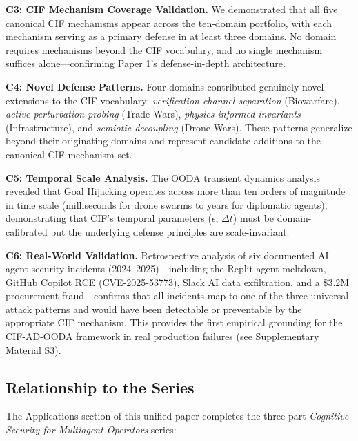 \documentclass[
]{article}
\begin{document}
\textbf{C3: CIF Mechanism Coverage Validation.} We demonstrated that all
five canonical CIF mechanisms appear across the ten-domain portfolio,
with each mechanism serving as a primary defense in at least three
domains. No domain requires mechanisms beyond the CIF vocabulary, and no
single mechanism suffices alone---confirming Paper 1's defense-in-depth
architecture.

\textbf{C4: Novel Defense Patterns.} Four domains contributed genuinely
novel extensions to the CIF vocabulary: \emph{verification channel
separation} (Biowarfare), \emph{active perturbation probing} (Trade
Wars), \emph{physics-informed invariants} (Infrastructure), and
\emph{semiotic decoupling} (Drone Wars). These patterns generalize
beyond their originating domains and represent candidate additions to
the canonical CIF mechanism set.

\textbf{C5: Temporal Scale Analysis.} The OODA transient dynamics
analysis revealed that Goal Hijacking operates across more than ten
orders of magnitude in time scale (milliseconds for drone swarms to
years for diplomatic agents), demonstrating that CIF's temporal
parameters (\(\epsilon\), \(\Delta t\)) must be domain-calibrated but
the underlying defense principles are scale-invariant.

\textbf{C6: Real-World Validation.} Retrospective analysis of six
documented AI agent security incidents (2024--2025)---including the
Replit agent meltdown, GitHub Copilot RCE (CVE-2025-53773), Slack AI
data exfiltration, and a \$3.2M procurement fraud---confirms that all
incidents map to one of the three universal attack patterns and would
have been detectable or preventable by the appropriate CIF mechanism.
This provides the first empirical grounding for the CIF-AD-OODA
framework in real production failures (see Supplementary Material S3).

\subsection{Relationship to the
Series}\label{relationship-to-the-series}

The Applications section of this unified paper completes the three-part
\emph{Cognitive Security for Multiagent Operators} series:
\end{document}
